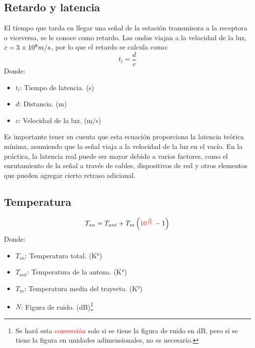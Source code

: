 \documentclass[
	12pt, %
	fleqn, %
	a4paper, %
	oneside, %
]{LegrandOrangeBook}
\begin{document}
\subsection{Retardo y latencia}
El tiempo que tarda en llegar una señal de la estación transmisora a la receptora o viceversa, se le conoce como retardo. Las ondas viajan a la velocidad de la luz, $c=3\times 10^{8} m/s$, por lo que el retardo se calcula como:
\begin{equation}
t_l=\frac{d}{c}
\end{equation}
Donde:
\begin{itemize}
\item $t_l$: Tiempo de latencia. (s)
\item $d$: Distancia. (m)
\item $c$: Velocidad de la luz. (m/s)
\end{itemize}
\begin{remark}
Es importante tener en cuenta que esta ecuación proporciona la latencia teórica mínima, asumiendo que la señal viaja a la velocidad de la luz en el vacío. En la práctica, la latencia real puede ser mayor debido a varios factores, como el enrutamiento de la señal a través de cables, dispositivos de red y otros elementos que pueden agregar cierto retraso adicional.
\end{remark}
\subsection{Temperatura}
\begin{equation}
T_{sn}=T_{ant}+T_m\left(\textcolor{red}{10^{\frac{N}{10}}}-1\right)
\label{eq:temp total sistema}
\end{equation}
Donde:
\begin{itemize}
\item $T_{sn}$: Temperatura total. (K°)
\item $T_{ant}$: Temperatura de la antena. (K°)
\item $T_m$: Temperatura media del trayecto. (K°)
\item $N$: Figura de ruido. (dB)\footnote{Se hará esta \textcolor{red}{conversión} solo si se tiene la figura de ruido en dB, pero si se tiene la figura en unidades adimensionales, no es necesario.}
\end{itemize}
\end{document}
